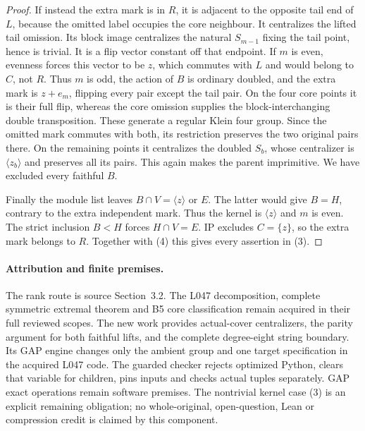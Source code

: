 \documentclass[11pt,a4paper]{article}
\newcommand{\gen}[1]{\langle#1\rangle}
\begin{document}
\begin{proof}
If instead the extra mark is in $R$, it is adjacent to
the opposite tail end of $L$, because the omitted label
occupies the core neighbour. It centralizes the lifted
tail omission. Its block image centralizes the natural
$S_{m-1}$ fixing the tail point, hence is trivial.
It is a flip vector constant off that endpoint.
If $m$ is even, evenness forces this vector to be $z$,
which commutes with $L$ and would belong to $C$, not $R$.
Thus $m$ is odd, the action of $B$ is ordinary doubled,
and the extra mark is $z+e_m$, flipping every pair
except the tail pair.
On the four core points it is their full flip, whereas
the core omission supplies the block-interchanging
double transposition. These generate a regular Klein
four group. Since the omitted mark commutes with both,
its restriction preserves the two original pairs there.
On the remaining points it centralizes the doubled
$S_b$, whose centralizer is $\gen{z_b}$ and preserves
all its pairs. This again makes the parent imprimitive.
We have excluded every faithful $B$.

Finally the module list leaves $B\cap V=\gen z$ or $E$.
The latter would give $B=H$, contrary to the extra
independent mark. Thus the kernel is $\gen z$ and $m$
is even. The strict inclusion $B<H$ forces $H\cap V=E$.
IP excludes $C=\{z\}$, so the extra mark belongs to $R$.
Together with (4) this gives every assertion in (3).
\end{proof}

\paragraph{Attribution and finite premises.}
The rank route is source Section~3.2. The L047 decomposition,
complete symmetric extremal theorem and B5 core classification
remain acquired in their full reviewed scopes. The new work
provides actual-cover centralizers, the parity argument for
both faithful lifts, and the complete degree-eight string
boundary. Its GAP engine changes only the ambient group and
one target specification in the acquired L047 code. The guarded
checker rejects optimized Python, clears that variable for
children, pins inputs and checks actual tuples separately.
GAP exact operations remain software premises. The nontrivial
kernel case (3) is an explicit remaining obligation; no
whole-original, open-question, Lean or compression credit
is claimed by this component.
\end{document}
